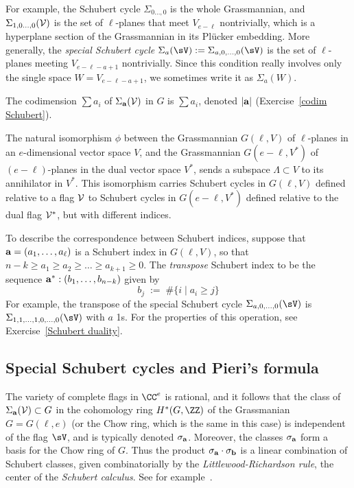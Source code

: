 
 
For example, the Schubert cycle $\Sigma_{0\dots,0}$ is the whole Grassmannian, 
and $\Sigma_{1,0\dots,0}(\cal V)$ is the set of $\ell$-planes that meet $V_{e-\ell}$ nontrivially, which is
a hyperplane section of the Grassmannian in its Pl\"ucker embedding. 
More generally, the
\emph{special Schubert cycle} 
$\Sigma_a(\sV) := \Sigma_{a,0,\dots, 0}(\sV)$ 
is the set of $\ell$-planes
meeting  $V_{e-\ell - a+1}$ nontrivially.
Since this condition really involves only the single space $W = V_{e-\ell-a+1}$, we sometimes 
 write it
as $\Sigma_a(W)$. 

 The codimension $\sum a_i$ of $\Sigma_{\bf a}({\cal V})$ in $G$ is $\sum a_i$, denoted $|{\bf a}|$ (Exercise~\ref{codim Schubert}).

The natural isomorphism $\phi$ between the Grassmannian $G(\ell, V)$ of $\ell$-planes in an $e$-dimensional vector space $V$, and the Grassmannian  $G(e-\ell, V^*)$ of $(e-\ell)$-planes in  the dual vector space $V^*$, sends a subspace $\Lambda \subset V$ to its annihilator in $V^*$. This isomorphism carries Schubert cycles in $G(\ell, V)$ defined relative to a flag $\cal V$ to Schubert cycles in $G(e-\ell, V^*)$ defined relative to the dual flag ${\cal V}^*$, but with different indices.

To describe the correspondence between Schubert indices,
suppose that ${\bf a} = (a_1,\dots, a_{\ell})$ is a Schubert index in $G(\ell, V)$, so that $n-k \geq a_1 \geq a_2 \geq \dots \geq a_{k+1} \geq 0$. The \emph{transpose} Schubert index to be the sequence ${\bf a}^*:  (b_1,\dots, b_{n-k})$ given by 
$$
 b_j \; := \; \#\{ i \mid a_i \geq j \}
$$
For example, the transpose of the special Schubert cycle
$\Sigma_{a,0,\dots,0}(\sV)$ is 
$\Sigma_{1,1,\dots,1,0,\dots,0}(\sV)$ with $a$ 1s.
For the properties of this operation, see Exercise~\ref{Schubert duality}.



\subsection{Special Schubert cycles and Pieri's formula}

\begin{fact}
The variety of complete flags in $\CC^e$ is rational, and it follows that the class of $\Sigma_{\bf a}({\cal V})\subset G$
in the cohomology ring $H^*(G, \ZZ)$ of the Grassmanian $G = G(\ell, e)$ (or the Chow ring, which is the same in this case) is independent
of the flag $\sV$, and is typically denoted $\sigma_{\bf a}$. Moreover, the classes $\sigma_{\bf a}$ form a basis for the Chow ring of $G$. Thus the product $\sigma_{\bf a} \cdot \sigma_{\bf b}$ is a linear combination of Schubert classes,
given combinatorially by the \emph{Littlewood-Richardson rule}, the center of the \emph{Schubert calculus}. See for example~\cite{MR2247964}.
\end{fact}


